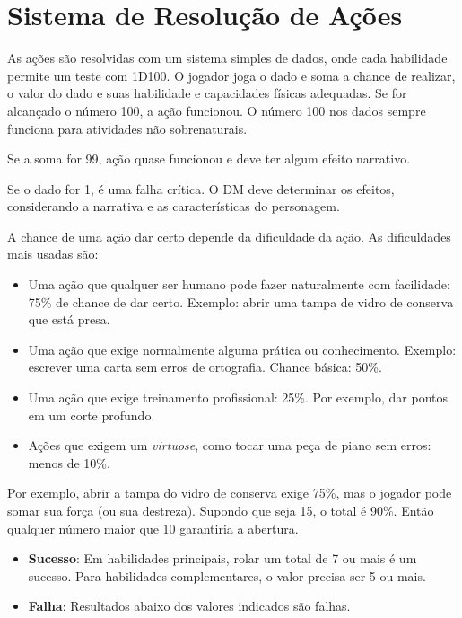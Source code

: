 \documentclass[a4paper,12pt]{book}
\begin{document}
\section{Sistema de Resolução de Ações}

As ações são resolvidas com um sistema simples de dados, onde cada habilidade permite um teste com 1D100. O jogador joga o dado e soma a chance de realizar, o valor do dado e suas habilidade e capacidades físicas adequadas. Se for alcançado o número 100, a ação funcionou. O número 100 nos dados sempre funciona para atividades não sobrenaturais.

Se a soma for 99, ação quase funcionou e deve ter algum efeito narrativo. 

Se o dado for 1, é uma falha crítica. O DM deve determinar os efeitos, considerando a narrativa e as características do personagem.

A chance de uma ação dar certo depende da dificuldade da ação. As dificuldades mais usadas são:

\begin{itemize}
    \item Uma ação que qualquer ser humano pode fazer naturalmente com facilidade: 75\% de chance de dar certo. Exemplo: abrir uma tampa de vidro de conserva que está presa.
    \item Uma ação que exige normalmente alguma prática ou conhecimento. Exemplo: escrever uma carta sem erros de ortografia. Chance básica: 50\%.
    \item Uma ação que exige treinamento profissional: 25\%. Por exemplo, dar pontos em um corte profundo.
    \item Ações que exigem um \textit{virtuose}, como tocar uma peça de piano sem erros: menos de 10\%.
\end{itemize}

Por exemplo, abrir a tampa do vidro de conserva exige 75\%, mas o jogador pode somar sua força (ou sua destreza). Supondo que seja 15, o total é 90\%. Então qualquer número maior que 10 garantiria a abertura.




\begin{itemize}
    \item \textbf{Sucesso}: Em habilidades principais, rolar um total de 7 ou mais é um sucesso. Para habilidades complementares, o valor precisa ser 5 ou mais.
    \item \textbf{Falha}: Resultados abaixo dos valores indicados são falhas.
\end{itemize}
\end{document}
